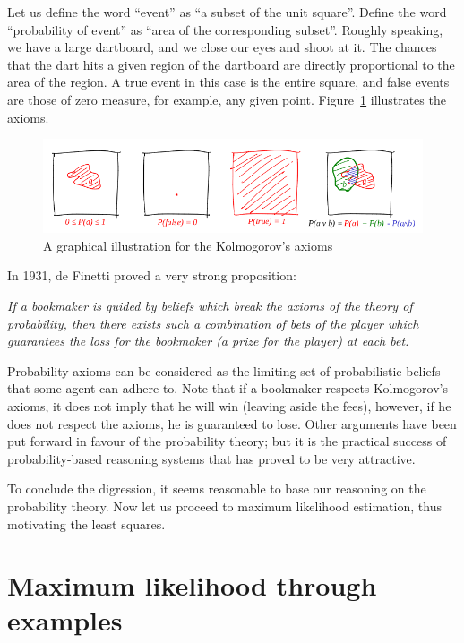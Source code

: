\documentclass[notitlepage]{report}
\begin{document}
Let us define the word ``event'' as ``a subset of the unit square''. 
Define the word ``probability of event'' as ``area of the corresponding subset''. 
Roughly speaking, we have a large dartboard, and we close our eyes and shoot at it. 
The chances that the dart hits a given region of the dartboard are directly proportional to the area of the region. 
A true event in this case is the entire square, and false events are those of zero measure, for example, any given point. 
Figure~\ref{fig:kolmogorov} illustrates the axioms.
\begin{figure}[htb!]
\centering
\includegraphics[width=.8\columnwidth]{axiomes.png}
\caption{A graphical illustration for the Kolmogorov's axioms}
\label{fig:kolmogorov}
\end{figure}

In 1931, de Finetti proved a very strong proposition:

\vspace{4mm}

\textit{If a bookmaker is guided by beliefs which break the axioms of the theory of probability,
then there exists such a combination of bets of the player which guarantees the loss for the bookmaker (a prize for the player) at each bet.
}

\vspace{4mm}

Probability axioms can be considered as the limiting set of probabilistic beliefs that some agent can adhere to.
Note that if a bookmaker respects Kolmogorov's axioms, it does not imply that he will win (leaving aside the fees),
however, if he does not respect the axioms, he is guaranteed to lose.
Other arguments have been put forward in favour of the probability theory;
but it is the practical success of probability-based reasoning systems that has proved to be very attractive.

To conclude the digression, it seems reasonable to base our reasoning on the probability theory.
Now let us proceed to maximum likelihood estimation, thus motivating the least squares.

\chapter{Maximum likelihood through examples}
\end{document}
